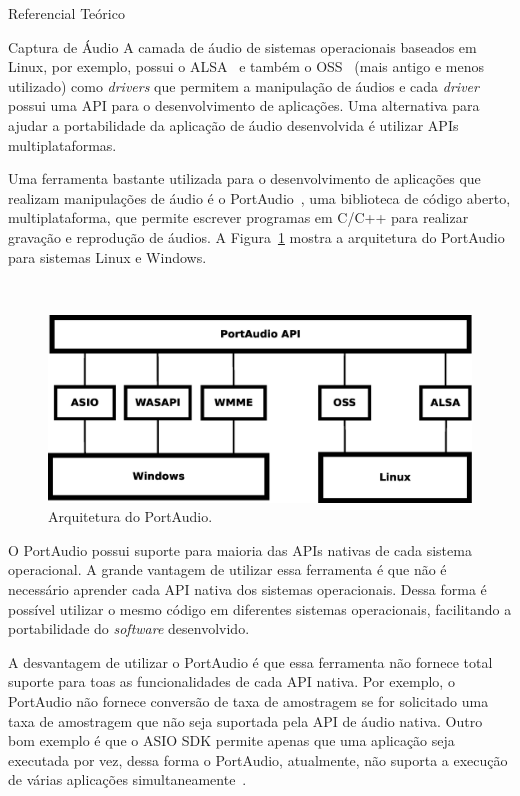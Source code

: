 \begin{chapter}{Referencial Teórico}
\begin{section}{Captura de Áudio}
A camada de áudio de sistemas operacionais baseados em Linux, por
exemplo, possui o ALSA~\cite{alsa} e também o OSS~\cite{oss} (mais antigo e
menos utilizado) como
\textit{drivers} que permitem a manipulação de áudios e cada \textit{driver}
possui uma API para o desenvolvimento de aplicações. Uma alternativa para ajudar
a portabilidade da aplicação de áudio desenvolvida é utilizar APIs
multiplataformas.

Uma ferramenta bastante utilizada para o desenvolvimento de aplicações que
realizam manipulações de áudio é o PortAudio~\cite{portaudio}, uma biblioteca de
código aberto, multiplataforma, que permite escrever programas em C/C++ para
realizar gravação e reprodução de áudios. A Figura~\ref{fig:portaudio} mostra a
arquitetura do PortAudio para sistemas Linux e Windows.

~

\begin{figure}[!h]
	\centering
	\begin{minipage}[c]{\textwidth}
	\centering
	\includegraphics[width=0.75\linewidth]{fig/portaudio}
	\caption{Arquitetura do PortAudio.}
	\label{fig:portaudio}
	\end{minipage}
\end{figure} 

O PortAudio possui suporte para maioria das APIs nativas de cada sistema
operacional. A grande vantagem de utilizar essa ferramenta é que não é
necessário aprender cada API nativa dos sistemas operacionais. Dessa forma é
possível utilizar o mesmo código em diferentes sistemas operacionais,
facilitando a portabilidade do \textit{software} desenvolvido.

A desvantagem de utilizar o PortAudio é que essa ferramenta não fornece total
suporte para toas as funcionalidades de cada API nativa. Por exemplo, o PortAudio não
fornece conversão de taxa de amostragem se for solicitado uma taxa de amostragem
que não seja suportada pela API de áudio nativa. Outro bom exemplo é que o ASIO
SDK permite apenas que uma aplicação seja executada por vez, dessa forma o
PortAudio, atualmente, não suporta a execução de várias aplicações
simultaneamente~\cite{portaudio}.


\end{section}
\end{chapter}
